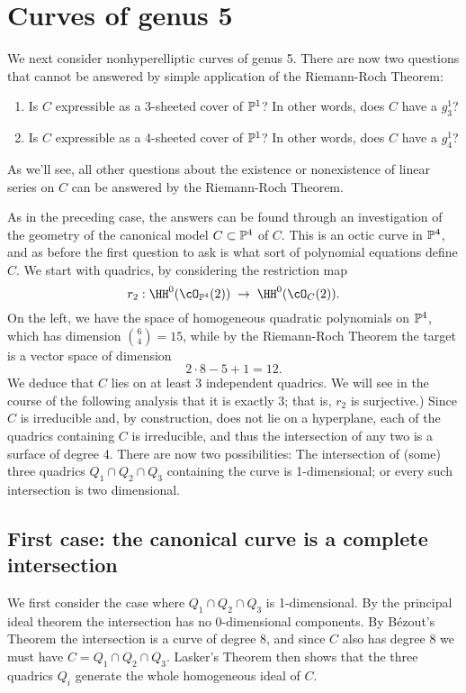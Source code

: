 \section{Curves of genus 5}

We next consider  nonhyperelliptic curves of genus 5. There are now two questions that cannot be answered by simple application of the Riemann-Roch Theorem:

\begin{enumerate}
\item Is $C$ expressible as a 3-sheeted cover of $\PP^1$? In other words, does $C$ have a $g^1_3$?
\item Is $C$ expressible as a 4-sheeted cover of $\PP^1$? In other words, does $C$ have a $g^1_4$?
\end{enumerate}

As we'll see, all other questions about the existence or nonexistence of linear series on $C$ can be answered by the Riemann-Roch Theorem.

As in the preceding case, the answers can be found through an investigation of the geometry of the canonical model $C \subset \PP^4$ of $C$. This is an octic curve in $\PP^4$, and as before the first question to ask is what sort of polynomial equations define $C$. We start with quadrics, by considering the restriction map
$$
r_2 : \HH^0(\cO_{\PP^4}(2)) \; \to \; \HH^0(\cO_{C}(2)).
$$
On the left, we have the space of homogeneous quadratic polynomials on $\PP^4$, which has dimension $\binom{6}{4} = 15$, while by the Riemann-Roch Theorem the target is a vector space of dimension
$$
2\cdot8 - 5 + 1 = 12.
$$
We deduce that $C$ lies on at least 3 independent quadrics. We will see in the course of the following analysis that it is exactly 3; that is, $r_2$ is surjective.) Since $C$ is irreducible and, by construction, does not lie on a hyperplane, each of the quadrics containing $C$ is irreducible, and thus the intersection of any two is a surface of degree 4. There are now two possibilities:  The intersection of (some) three quadrics $Q_1 \cap Q_2 \cap Q_3$ containing the curve is 1-dimensional; or every such intersection is two dimensional. 

\subsection{First case: the canonical curve is a complete intersection}

We first consider the case where $Q_1 \cap Q_2 \cap Q_3$ is 1-dimensional. By the principal ideal theorem the intersection has no 0-dimensional components. By B\'ezout's Theorem the intersection is a curve of degree 8, and since $C$ also has degree 8 we must have $C=Q_1 \cap Q_2 \cap Q_3$. Lasker's Theorem then shows that the three quadrics $Q_i$ generate the whole homogeneous ideal of $C$.

